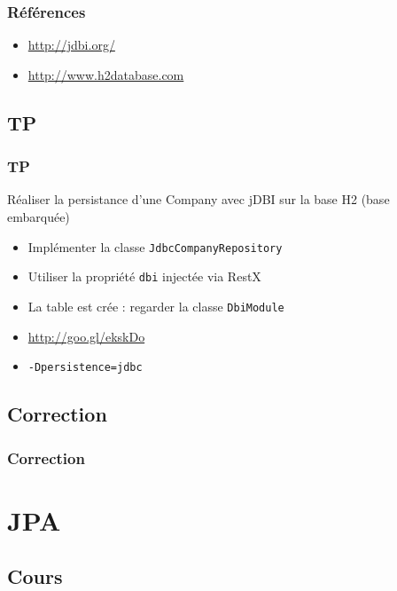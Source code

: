 \documentclass[t,12pt]{beamer}
\begin{document}
\begin{frame}
	\frametitle{R\'ef\'erences}

	\begin{itemize}
		\item \url{http://jdbi.org/}
		\item \url{http://www.h2database.com}
	\end{itemize}
\end{frame}

\subsection{TP}

\begin{frame}
	\frametitle{TP}

	\begin{block}{R\'ealiser la persistance d'une Company avec jDBI sur la base H2 (base embarqu\'ee)}
		\begin{itemize}
			\item Impl\'ementer la classe \lstinline{JdbcCompanyRepository}
			\item Utiliser la propri\'et\'e \lstinline{dbi} inject\'ee via RestX
			\item La table est cr\'ee : regarder la classe \lstinline{DbiModule}
			\item \url{http://goo.gl/ekskDo}
			\item \lstinline{-Dpersistence=jdbc}
		\end{itemize}
	\end{block}
\end{frame}

\subsection{Correction}
\begin{frame}
	\frametitle{Correction}
\end{frame}

\section{JPA}

\begin{frame}
	\tableofcontents[currentsection]
\end{frame}

\subsection{Cours}
\end{document}
